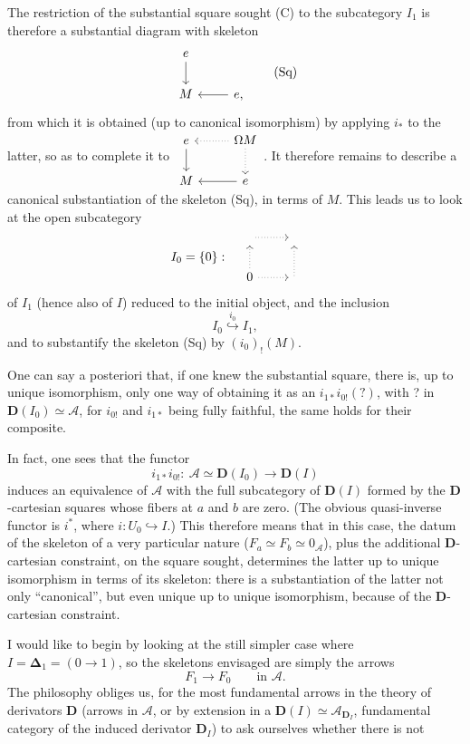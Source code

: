 \documentclass[11pt]{article}
\newcommand{\printedpage}[1]{\marginpar{\footnotesize p.~#1}}
\newcommand{\msp}[1]{\marginpar{\footnotesize [#1]}}
\newcommand{\D}{\mathbf{D}}
\newcommand{\cA}{\mathcal{A}}
\newcommand{\bDelta}{\boldsymbol{\Delta}}
\begin{document}
\msp{page 76}

The restriction of the substantial square sought (C) to the subcategory $I_1$ is therefore a substantial diagram with skeleton
\[
\begin{tikzcd}
e \arrow[d] \\
M & e, \arrow[l]
\end{tikzcd}
\tag*{(Sq)}
\]
\printedpage{3}
from which it is obtained (up to canonical isomorphism) by applying $i_*$ to the latter, so as to complete it to $\begin{tikzcd}
e \arrow[d] & \Omega M \arrow[l, dotted] \arrow[d, dotted] \\
M & e \arrow[l]
\end{tikzcd}$. It therefore remains to describe a canonical substantiation of the skeleton (Sq), in terms of $M$. This leads us to look at the open subcategory
\[
I_0 = \{0\} :\quad
\begin{tikzcd}
{} \arrow[r, dotted] & {} \\
0 \arrow[u, dotted] \arrow[r, dotted] & {} \arrow[u, dotted]
\end{tikzcd}
\]
of $I_1$ (hence also of $I$) reduced to the initial object, and the inclusion
\[
I_0 \overset{i_0}{\hookrightarrow} I_1,
\]
and to substantify the skeleton (Sq) by $(i_0)_!(M)$.

One can say a posteriori that, if one knew the substantial square, there is, up to unique isomorphism, only one way of obtaining it as an $i_{1*}i_{0!}(?)$, with ? in $\D(I_0)\simeq\cA$, for $i_{0!}$ and $i_{1*}$ being fully faithful, the same holds for their composite.

\msp{page 77}

In fact, one sees that the functor
\[
i_{1*}i_{0!} :\ \cA\simeq\D(I_0) \longrightarrow \D(I)
\]
induces an equivalence of $\cA$ with the full subcategory of $\D(I)$ formed by the $\D$-cartesian squares whose fibers at $a$ and $b$ are zero. (The obvious quasi-inverse functor is $i^*$, where $i : U_0 \hookrightarrow I$.) This therefore means that in this case, the datum of the skeleton of a very particular nature ($F_a\simeq F_b\simeq 0_{\cA}$), plus the additional $\D$-cartesian constraint, on the square sought, determines the latter up to unique isomorphism in terms of its skeleton: there is a substantiation of the latter not only ``canonical'', but even unique up to unique isomorphism, because of the $\D$-cartesian constraint.

I would like to begin by looking at the still simpler case where $I=\bDelta_1=(0\longrightarrow 1)$, so the skeletons envisaged are simply the arrows
\[
F_1 \longrightarrow F_0 \qquad \text{in } \cA.
\]
The philosophy obliges us, for the most fundamental arrows in the theory of derivators $\D$ (arrows in $\cA$, or by extension in a $\D(I)\simeq\cA_{\D_I}$, fundamental category of the induced derivator $\D_I$) to ask ourselves whether there is not
\end{document}
